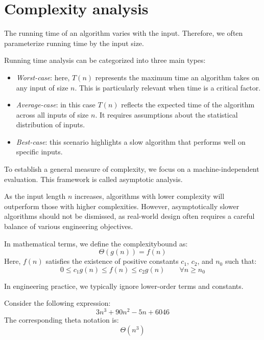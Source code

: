 \section{Complexity analysis}

The running time of an algorithm varies with the input. 
Therefore, we often parameterize running time by the input size.

Running time analysis can be categorized into three main types:
\begin{itemize}
    \item \textit{Worst-case}: here, $T(n)$ represents the maximum time an algorithm takes on any input of size $n$. 
        This is particularly relevant when time is a critical factor.
    \item \textit{Average-case}: in this case $T(n)$ reflects the expected time of the algorithm across all inputs of size $n$. 
        It requires assumptions about the statistical distribution of inputs.
    \item \textit{Best-case}: this scenario highlights a slow algorithm that performs well on specific inputs.
\end{itemize}
To establish a general measure of complexity, we focus on a machine-independent evaluation.
This framework is called asymptotic analysis. 

As the input length $n$ increases, algorithms with lower complexity will outperform those with higher complexities. 
However, asymptotically slower algorithms should not be dismissed, as real-world design often requires a careful balance of various engineering objectives. 

In mathematical terms, we define the complexitybound as:
\[\Theta\left(g(n)\right)=f(n)\]
Here, $f(n)$ satisfies the existence of positive constants $c_1$, $c_2$, and $n_0$ such that:
\[0 \leq c_1 g(n) \leq f (n) \leq c_2  g(n) \qquad\forall n \geq n_0\]

In engineering practice, we typically ignore lower-order terms and constants.
\begin{example}
    Consider the following expression: 
    \[3n^3+90n^2-5n+6046\]
    The corresponding theta notation is:
    \[\Theta(n^3)\]
\end{example}

